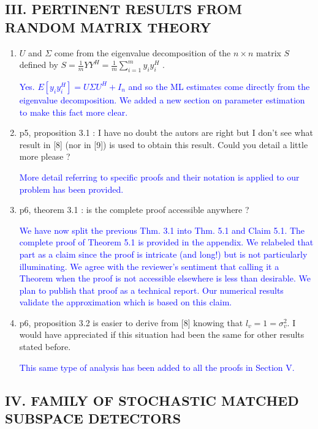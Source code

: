 \documentclass[11pt]{article}
\begin{document}
\subsection*{III. PERTINENT RESULTS FROM RANDOM MATRIX THEORY}
\begin{enumerate}
\item $U$ and $\Sigma$ come from the eigenvalue decomposition of the $n\times n$ matrix $S$ defined by $S=\frac{1}{m}YY^H=\frac{1}{m}\sum_{i=1}^my_iy_i^H$ .


  \textcolor{blue}{Yes. $E[y_iy_i^H]=U\Sigma U^H +I_n$ and so the ML estimates come directly from the eigenvalue decomposition. We added a new section on parameter estimation to make this fact more clear.}

\item p5, proposition 3.1 : I have no doubt the autors are right but I don't see what result in [8] (nor in [9]) is
used to obtain this result. Could you detail a little more please ?

\textcolor{blue}{More detail referring to specific proofs and their notation is applied to our problem has been provided.}

\item p6, theorem 3.1 : is the complete proof accessible anywhere ?

\textcolor{blue}{We have now split the previous Thm. 3.1 into Thm. 5.1 and Claim 5.1. The complete proof of Theorem 5.1 is provided in the appendix. We relabeled that part as a claim since the proof is intricate (and long!) but is not particularly illuminating. We agree with the reviewer's sentiment that calling it a Theorem when the proof is not accessible elsewhere is less than desirable. We plan to publish that proof as a technical report. Our numerical results validate the approximation which is based on this claim.}

\item p6, proposition 3.2 is easier to derive from [8] knowing that $l_v=1=\sigma_v^2$. I would have appreciated if this
situation had been the same for other results stated before.

\textcolor{blue}{This same type of analysis has been added to all the proofs in Section V.}

\end{enumerate}
\subsection*{IV. FAMILY OF STOCHASTIC MATCHED SUBSPACE DETECTORS}
\end{document}
